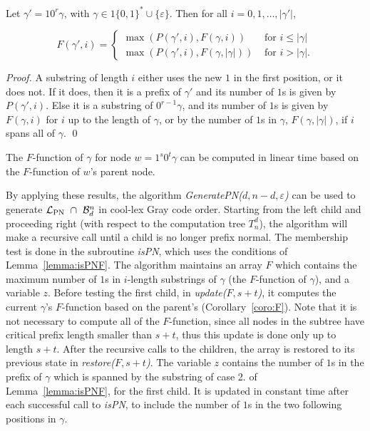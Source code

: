 \documentclass[11pt,a4paper]{llncs}
\renewcommand{\epsilon}{\varepsilon}
\newcommand{\LPN}{{\mathcal L}_{\textrm{PN}}}
\begin{document}
\begin{lemma}
\label{lemma:FPCalculate}
Let $\gamma' = 10^r\gamma$, with $\gamma\in 1\{0,1\}^* \cup \{\epsilon\}$. Then for all $i=0,1,\ldots,|\gamma'|$,

$$ F(\gamma',i) =  \begin{cases}\max(P(\gamma',i), F(\gamma,i)) & \text{ for } i\leq |\gamma|\\
\max(P(\gamma',i), F(\gamma,|\gamma|)) & \text{ for } i > |\gamma|. 
\end{cases}$$

\end{lemma}

\begin{proof}
A substring of length $i$ either uses the new $1$ in the first position, or it does not. If it does, then it is a prefix of $\gamma'$ and its number of $1$s is given by $P(\gamma',i)$. Else it is a substring of $0^{r-1}\gamma$, and its number of $1$s is given by $F(\gamma,i)$ for $i$ up to the length of $\gamma$, or by the number of $1$s in $\gamma$, $F(\gamma,|\gamma|)$, if $i$ spans all of $\gamma$. \hfill \qed
\end{proof}



\begin{corollary}\label{coro:F}
The $F$-function of $\gamma$ for node $w=1^s0^t\gamma$ can be computed in linear time based on the $F$-function of $w$'s parent node.
\end{corollary}


By applying these results, the algorithm {\em GeneratePN($d,n-d,\epsilon$)}  can be used to generate $\LPN \ \cap  \ {\cal B}^n_d$ in cool-lex Gray code order.  Starting from the left child and proceeding right (with respect to the computation tree $T_n^d$), the algorithm will make a recursive call until a child is no longer prefix normal. 
The membership test is done in the subroutine {\em isPN}, which uses the conditions of Lemma~\ref{lemma:isPNF}. The algorithm maintains an array $F$ which contains the maximum number of $1$s in $i$-length substrings of $\gamma$ (the $F$-function of $\gamma$), and a variable $z$. Before testing the first child, in {\em update($F,s+t$)}, it computes the current $\gamma$'s $F$-function based on the parent's (Corollary~\ref{coro:F}). Note that it is not necessary to compute all of the $F$-function, since all nodes in the subtree have critical prefix length smaller than $s+t$, thus this update is done only up to length $s+t$. After the recursive calls to the children, the array is restored to its previous state in {\em restore($F,s+t$)}. The variable $z$ contains the number of $1$s in the prefix of $\gamma$ which is spanned by the substring of case 2. of Lemma~\ref{lemma:isPNF}, for the first child. It is updated in constant time after each successful call to {\em isPN}, to include the number of $1$s in the two following positions in $\gamma$.
\end{document}
